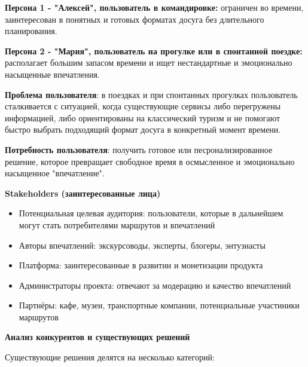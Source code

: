 \documentclass[a4paper]{article}
\begin{document}
\begin{description}
    \textbf{Персона 1 - "Алексей", пользователь в командировке:} ограничен во времени, заинтересован в понятных и готовых форматах досуга без длительного планирования.

    \textbf{Персона 2 - "Мария", пользователь на прогулке или в спонтанной поездке:} располагает большим запасом времени и ищет нестандартные и эмоционально насыщенные впечатления.

    \textbf{Проблема пользователя}: в поездках и при спонтанных прогулках пользователь сталкивается с ситуацией, когда существующие сервисы либо перегружены информацией, либо ориентированы на классический туризм и не помогают быстро выбрать подходящий формат досуга в конкретный момент времени.

    \textbf{Потребность пользователя}: получить готовое или песронализированное решение, которое превращает свободное время в осмысленное и эмоционально насыщенное "впечатление".

    \item[\large1.3] \large \textbf{Stakeholders (заинтересованные лица)}
    
    \normalsize
    \begin{itemize}[label=$-$]
        \item Потенциальная целевая аудитория: пользователи, которые в дальнейшем могут стать потребителями маршрутов и впечатлений
        \item Авторы впечатлений: экскурсоводы, эксперты, блогеры, энтузиасты
        \item Платформа: заинтересованные в развитии и монетизации продукта
        \item Администраторы проекта: отвечают за модерацию и качество впечатлений
        \item Партнёры: кафе, музеи, транспортные компании, потенциальные участиники маршрутов
    \end{itemize}

    \item[\large1.4] \large \textbf{Анализ конкурентов и существующих решений}
    \normalsize

    Существующие решения делятся на несколько категорий:


\end{description}
\end{document}
